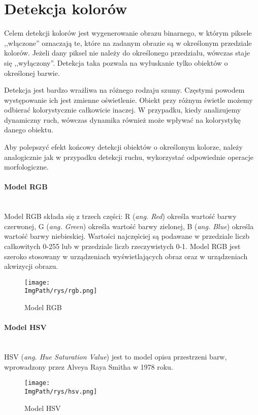 \documentclass[a4paper,12pt,twoside,openany]{report}
\newcommand{\ImgPath}{.}
\begin{document}
\section{Detekcja kolorów}
Celem detekcji kolorów jest wygenerowanie obrazu binarnego, w którym piksele ,,włączone'' oznaczają te, które na zadanym obrazie są w określonym przedziale kolorów. Jeżeli dany piksel nie należy do określonego  przedziału, wówczas staje się ,,wyłączony''. Detekcja taka pozwala na wyłuskanie tylko obiektów o określonej barwie.

Detekcja jest bardzo wrażliwa na różnego rodzaju szumy. Częstymi powodem występowanie ich jest zmienne oświetlenie. Obiekt przy różnym świetle możemy odbierać kolorystycznie całkowicie inaczej. W przypadku, kiedy analizujemy dynamiczny ruch, wówczas dynamika również może wpływać na kolorystykę danego obiektu.  

Aby polepszyć efekt końcowy detekcji obiektów o określonym kolorze, należy analogicznie jak w przypadku detekcji ruchu, wykorzystać odpowiednie operacje morfologiczne. 

\paragraph{Model RGB} \mbox{} \\
\indent
Model RGB składa się z trzech części: R (\textit{ang. Red}) określa wartość barwy czerwonej, G (\textit{ang. Green}) określa wartość barwy zielonej, B (\textit{ang. Blue}) określa wartość barwy niebieskiej. Wartości najczęściej są podawane w przedziale liczb całkowitych 0-255 lub w przedziale liczb rzeczywistych 0-1. Model RGB jest szeroko stosowany w urządzeniach wyświetlających obraz oraz w urządzeniach akwizycji obrazu.
\begin{figure}[H]	
	\centering
	\texttt{[image: \\ImgPath/rys/rgb.png]}
	
	\caption{Model RGB}
\end{figure}

\paragraph{Model HSV} \mbox{} \\ \indent
HSV (\textit{ang. Hue Saturation Value}) jest to model opisu przestrzeni barw, wprowadzony przez Alveya Raya Smitha w 1978 roku.

\begin{figure}[H]	
	\centering
	\texttt{[image: \\ImgPath/rys/hsv.png]}
	
	\caption{Model HSV}
\end{figure}
\end{document}
